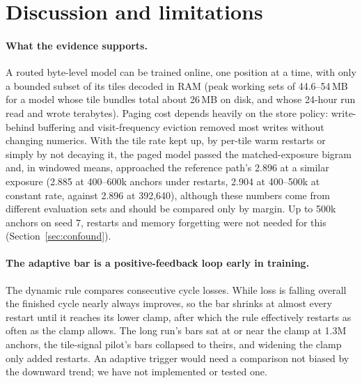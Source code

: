 \documentclass[10pt]{article}
\begin{document}
\section{Discussion and limitations}
\label{sec:limits}

\paragraph{What the evidence supports.} A routed byte-level model can be trained online, one position at
a time, with only a bounded subset of its tiles decoded in RAM (peak working sets of 44.6--54\,MB for a
model whose tile bundles total about 26\,MB on disk, and whose 24-hour run read and wrote terabytes).
Paging cost depends heavily on the store policy: write-behind buffering and visit-frequency eviction
removed most writes without changing numerics. With the tile rate kept up, by per-tile warm restarts
or simply by not decaying it, the paged model passed the matched-exposure bigram and, in windowed
means, approached the reference path's 2.896 at a similar exposure (2.885 at 400--600k anchors under
restarts, 2.904 at 400--500k at constant rate, against 2.896 at 392,640), although these numbers come
from different evaluation sets and should be compared only by margin. Up to 500k anchors on seed 7,
restarts and memory forgetting were not needed for this (Section~\ref{sec:confound}).

\paragraph{The adaptive bar is a positive-feedback loop early in training.} The dynamic rule compares
consecutive cycle losses. While loss is falling overall the finished cycle nearly always improves, so
the bar shrinks at almost every restart until it reaches its lower clamp, after which the rule
effectively restarts as often as the clamp allows. The long run's bars sat at or near the clamp at
1.3M anchors, the tile-signal pilot's bars collapsed to theirs, and widening the clamp only added
restarts. An adaptive trigger would need a comparison not biased by the downward trend; we have not
implemented or tested one.
\end{document}
